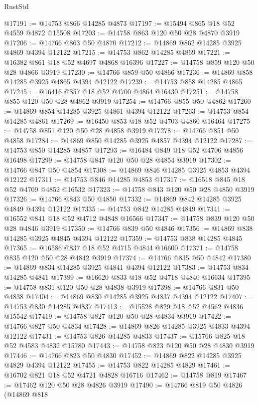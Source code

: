 \begin{lexlean}{RustStd}
\begin{coremodule}
@17191 := @14753 @866 @14285 @4873
@17197 := @15494 @865 @18 @52 @4559 @4872 @15508
@17203 := @14758 @863 @120 @50 @28 @4870 @3919
@17206 := @14766 @863 @50 @4870
@17212 := @14869 @862 @14285 @3925 @4869 @4394 @12122
@17215 := @14753 @862 @14285 @4869
@17221 := @16382 @861 @18 @52 @4697 @4868 @16396
@17227 := @14758 @859 @120 @50 @28 @4866 @3919
@17230 := @14766 @859 @50 @4866
@17236 := @14869 @858 @14285 @3925 @4865 @4394 @12122
@17239 := @14753 @858 @14285 @4865
@17245 := @16416 @857 @18 @52 @4700 @4864 @16430
@17251 := @14758 @855 @120 @50 @28 @4862 @3919
@17254 := @14766 @855 @50 @4862
@17260 := @14869 @854 @14285 @3925 @4861 @4394 @12122
@17263 := @14753 @854 @14285 @4861
@17269 := @16450 @853 @18 @52 @4703 @4860 @16464
@17275 := @14758 @851 @120 @50 @28 @4858 @3919
@17278 := @14766 @851 @50 @4858
@17284 := @14869 @850 @14285 @3925 @4857 @4394 @12122
@17287 := @14753 @850 @14285 @4857
@17293 := @16484 @849 @18 @52 @4706 @4856 @16498
@17299 := @14758 @847 @120 @50 @28 @4854 @3919
@17302 := @14766 @847 @50 @4854
@17308 := @14869 @846 @14285 @3925 @4853 @4394 @12122
@17311 := @14753 @846 @14285 @4853
@17317 := @16518 @845 @18 @52 @4709 @4852 @16532
@17323 := @14758 @843 @120 @50 @28 @4850 @3919
@17326 := @14766 @843 @50 @4850
@17332 := @14869 @842 @14285 @3925 @4849 @4394 @12122
@17335 := @14753 @842 @14285 @4849
@17341 := @16552 @841 @18 @52 @4712 @4848 @16566
@17347 := @14758 @839 @120 @50 @28 @4846 @3919
@17350 := @14766 @839 @50 @4846
@17356 := @14869 @838 @14285 @3925 @4845 @4394 @12122
@17359 := @14753 @838 @14285 @4845
@17365 := @16586 @837 @18 @52 @4715 @4844 @16600
@17371 := @14758 @835 @120 @50 @28 @4842 @3919
@17374 := @14766 @835 @50 @4842
@17380 := @14869 @834 @14285 @3925 @4841 @4394 @12122
@17383 := @14753 @834 @14285 @4841
@17389 := @16620 @833 @18 @52 @4718 @4840 @16634
@17395 := @14758 @831 @120 @50 @28 @4838 @3919
@17398 := @14766 @831 @50 @4838
@17404 := @14869 @830 @14285 @3925 @4837 @4394 @12122
@17407 := @14753 @830 @14285 @4837
@17413 := @15528 @829 @18 @52 @4562 @4836 @15542
@17419 := @14758 @827 @120 @50 @28 @4834 @3919
@17422 := @14766 @827 @50 @4834
@17428 := @14869 @826 @14285 @3925 @4833 @4394 @12122
@17431 := @14753 @826 @14285 @4833
@17437 := @15766 @825 @18 @52 @4583 @4832 @15780
@17443 := @14758 @823 @120 @50 @28 @4830 @3919
@17446 := @14766 @823 @50 @4830
@17452 := @14869 @822 @14285 @3925 @4829 @4394 @12122
@17455 := @14753 @822 @14285 @4829
@17461 := @16702 @821 @18 @52 @4721 @4828 @16716
@17462 := @14758 @819
@17467 := @17462 @120 @50 @28 @4826 @3919
@17490 := @14766
    @819
    @50
    @4826
    (@14869
      @818

\end{coremodule}
\end{lexlean}
